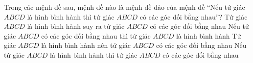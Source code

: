 \begin{ex}%
	Trong các  mệnh đề sau, mệnh đề nào là mệnh đề đảo của mệnh đề “Nếu tứ giác $ABCD$ là hình bình hành thì tứ giác $ABCD$ có các góc đối bằng nhau”?
	\choice 
		{Tứ giác $ABCD$ là hình bình hành suy ra tứ giác $ABCD$  có các góc đối bằng nhau}
		{\True Nếu tứ giác $ABCD$ có các góc đối bằng nhau  thì tứ giác $ABCD$ là hình bình hành}
		{Tứ giác $ABCD$ là  hình bình hành nên tứ giác $ABCD$ có các góc đối bằng nhau}
		{Nếu tứ giác $ABCD$ là hình bình hành thì tứ giác $ABCD$ có các góc đối bằng nhau} 
\end{ex}

